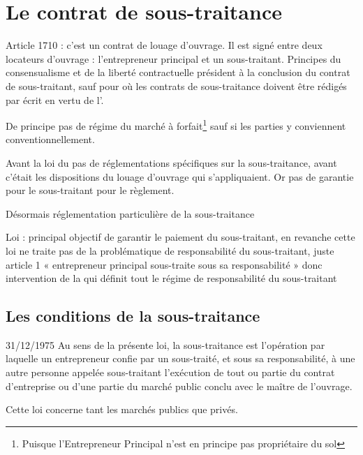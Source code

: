 
\chapter{Le contrat de sous-traitance}

	Article 1710 : c’est un contrat de louage d’ouvrage. Il est signé entre deux locateurs d’ouvrage : l’entrepreneur principal et un sous-traitant. Principes du consensualisme et de la liberté contractuelle président à la conclusion du contrat de sous-traitant, sauf pour \CCMI où les contrats de sous-traitance doivent être rédigés par écrit en vertu de l'.

	De principe pas de régime du marché à forfait\footnote{Puisque l'Entrepreneur Principal n'est en principe pas propriétaire du sol} sauf si les parties y conviennent conventionnellement.


	Avant la loi du  pas de réglementations spécifiques sur la sous-traitance, avant c’était les dispositions du louage d’ouvrage qui s’appliquaient. Or pas de garantie pour le sous-traitant pour le règlement.


	Désormais réglementation particulière de la sous-traitance


	Loi  : principal objectif de garantir le paiement du sous-traitant, en revanche cette loi ne traite pas de la problématique de responsabilité du sous-traitant, juste article 1 « entrepreneur principal sous-traite sous sa responsabilité » donc intervention de la \jp qui définit tout le régime de responsabilité du sous-traitant



\section{Les conditions de la sous-traitance}

	\begin{citationArticleLoi}[75-1334]{1}{31/12/1975}
		Au sens de la présente loi, la sous-traitance est l'opération par laquelle un entrepreneur confie par un sous-traité, et sous sa responsabilité, à une autre personne appelée sous-traitant l'exécution de tout ou partie du contrat d'entreprise ou d'une partie du marché public conclu avec le maître de l'ouvrage.
	\end{citationArticleLoi}

	Cette loi concerne tant les marchés publics que privés.

